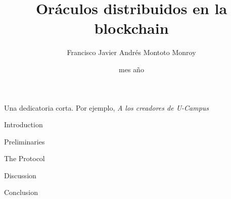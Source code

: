 \documentclass[upright, contnum]{umemoria}
\author{Francisco Javier Andr\'es Montoto Monroy}
\title{Or\'aculos distribuidos en la blockchain}
\date{mes {a\~no}}
\begin{document}
\frontmatter
\maketitle

\begin{abstract}
	
\end{abstract}

\begin{dedicatoria} %
	Una dedicatoria corta. Por ejemplo, \emph{A los creadores de U-Campus}
\end{dedicatoria}

\begin{thanks} %
	\lipsum[1-2]
\end{thanks}
\cleardoublepage
{}
\tableofcontents
\listoftables %
\listoffigures %

\mainmatter

\begin{my_section}{Introduction}
	
\end{my_section}

\begin{my_section}{Preliminaries}
	
	
	
	
	
\end{my_section}

\begin{my_section}{The Protocol}
    
	
	
	
	
    
	
\end{my_section}

\begin{my_section}{Discussion}
	
    
    
\end{my_section}

\begin{my_section}{Conclusion}
	
\end{my_section}

\printbibliography
\end{document}

